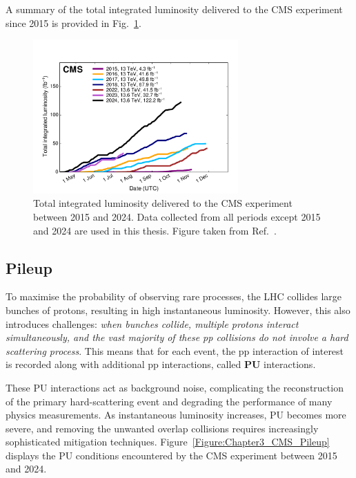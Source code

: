A summary of the total integrated luminosity delivered to the CMS experiment since 2015 is provided in Fig.~\ref{Figure:Chapter3_CMS_IntegratedLumi}.

\begin{figure}[h]
\centering
\includegraphics[width= 0.7\textwidth]{Figures/Chapter3/CMS_IntegratedLumi.pdf}
\caption[Total integrated luminosity delivered to the CMS experiment between 2015 and 2024]{Total integrated luminosity delivered to the CMS experiment between 2015 and 2024. Data collected from all periods except 2015 and 2024 are used in this thesis. Figure taken from Ref.~\cite{CMS_IntegratedLumi}.}
\label{Figure:Chapter3_CMS_IntegratedLumi}
\end{figure}

\subsection{Pileup}

To maximise the probability of observing rare processes, the LHC collides large bunches of protons, resulting in high instantaneous luminosity. However, this also introduces challenges: \textit{when bunches collide, multiple protons interact simultaneously, and the vast majority of these pp collisions do not involve a hard scattering process}. This means that for each event, the pp interaction of interest is recorded along with additional pp interactions, called \textbf{\ac{PU}} interactions. 

These PU interactions act as background noise, complicating the reconstruction of the primary hard-scattering event and degrading the performance of many physics measurements. As instantaneous luminosity increases, PU becomes more severe, and removing the unwanted overlap collisions requires increasingly sophisticated mitigation techniques. Figure~\ref{Figure:Chapter3_CMS_Pileup} displays the PU conditions encountered by the CMS experiment between 2015 and 2024.

